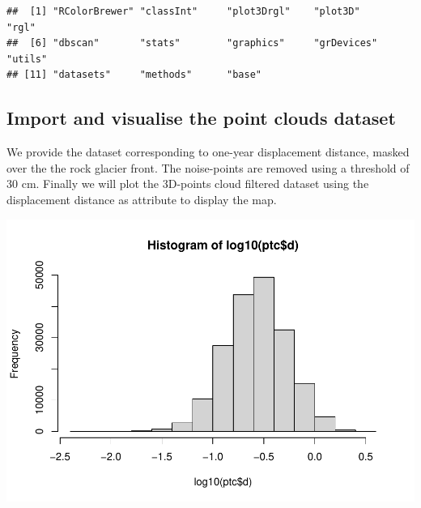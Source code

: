 \documentclass[
]{book}
\newenvironment{Shaded}{\begin{snugshade}}{\end{snugshade}}
\newcommand{\AttributeTok}[1]{\textcolor[rgb]{0.13,0.29,0.53}{#1}}
\newcommand{\CommentTok}[1]{\textcolor[rgb]{0.56,0.35,0.01}{\textit{#1}}}
\newcommand{\ConstantTok}[1]{\textcolor[rgb]{0.56,0.35,0.01}{#1}}
\newcommand{\FunctionTok}[1]{\textcolor[rgb]{0.13,0.29,0.53}{\textbf{#1}}}
\newcommand{\NormalTok}[1]{#1}
\newcommand{\OtherTok}[1]{\textcolor[rgb]{0.56,0.35,0.01}{#1}}
\newcommand{\SpecialCharTok}[1]{\textcolor[rgb]{0.81,0.36,0.00}{\textbf{#1}}}
\newcommand{\StringTok}[1]{\textcolor[rgb]{0.31,0.60,0.02}{#1}}
\begin{document}
\begin{verbatim}
##  [1] "RColorBrewer" "classInt"     "plot3Drgl"    "plot3D"       "rgl"         
##  [6] "dbscan"       "stats"        "graphics"     "grDevices"    "utils"       
## [11] "datasets"     "methods"      "base"
\end{verbatim}

\hypertarget{import-and-visualise-the-point-clouds-dataset}{%
\subsection{Import and visualise the point clouds dataset}\label{import-and-visualise-the-point-clouds-dataset}}

We provide the dataset corresponding to one-year displacement distance, masked over the the rock glacier front.
The noise-points are removed using a threshold of 30 cm.
Finally we will plot the 3D-points cloud filtered dataset using the displacement distance as attribute to display the map.

\begin{Shaded}
\end{Shaded}

\includegraphics{04-DBSCAN_files/figure-latex/import-data-1.pdf}
\end{document}
